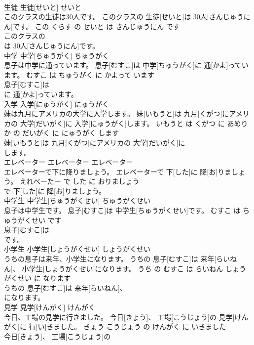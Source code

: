 \documentclass[8pt]{extreport}
\begin{document}
\begin{CJK}{UTF8}{min}
\\	生徒	生徒[せいと]	せいと	
\\	このクラスの生徒は30人です。	このクラスの 生徒[せいと]は 30人[さんじゅうにん]です。	この くらす の せいと は さんじゅうにん です	
\\	このクラスの
\\	は 30人[さんじゅうにん]です。			
\\	中学	中学[ちゅうがく]	ちゅうがく	
\\	息子は中学に通っています。	息子[むすこ]は 中学[ちゅうがく]に 通[かよ]っています。	むすこ は ちゅうがく に かよって います	
\\	息子[むすこ]は
\\	に 通[かよ]っています。			
\\	入学	入学[にゅうがく]	にゅうがく	
\\	妹は九月にアメリカの大学に入学します。	妹[いもうと]は 九月[くがつ]にアメリカの 大学[だいがく]に 入学[にゅうがく]します。	いもうと は くがつ に あめりか の だいがく に にゅうがく します	
\\	妹[いもうと]は 九月[くがつ]にアメリカの 大学[だいがく]に
\\	します。			
\\	エレベーター	エレベーター	エレベーター	
\\	エレベーターで下に降りましょう。	エレベーターで 下[した]に 降[お]りましょう。	えれべーたー で した に おりましょう	
\\	で 下[した]に 降[お]りましょう。			
\\	中学生	中学生[ちゅうがくせい]	ちゅうがくせい	
\\	息子は中学生です。	息子[むすこ]は 中学生[ちゅうがくせい]です。	むすこ は ちゅうがくせい です	
\\	息子[むすこ]は
\\	です。			
\\	小学生	小学生[しょうがくせい]	しょうがくせい	
\\	うちの息子は来年、小学生になります。	うちの 息子[むすこ]は 来年[らいねん]、 小学生[しょうがくせい]になります。	うち の むすこ は らいねん しょうがくせい に なります	
\\	うちの 息子[むすこ]は 来年[らいねん]、
\\	になります。			
\\	見学	見学[けんがく]	けんがく	
\\	今日、工場の見学に行きました。	今日[きょう]、 工場[こうじょう]の 見学[けんがく]に 行[い]きました。	きょう こうじょう の けんがく に いきました	
\\	今日[きょう]、 工場[こうじょう]の

\end{CJK}
\end{document}
